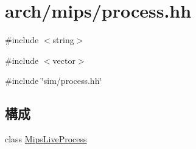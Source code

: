 \hypertarget{arch_2mips_2process_8hh}{
\section{arch/mips/process.hh}
\label{arch_2mips_2process_8hh}
}
{\ttfamily \#include $<$string$>$}\par
{\ttfamily \#include $<$vector$>$}\par
{\ttfamily \#include \char`\"{}sim/process.hh\char`\"{}}\par
\subsection*{構成}
\begin{DoxyCompactItemize}
\item 
class \hyperlink{classMipsLiveProcess}{MipsLiveProcess}
\end{DoxyCompactItemize}
